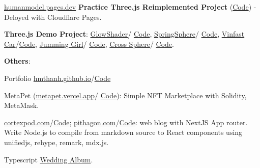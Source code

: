 \cvspace
\begin{twocolentry}{\href{https://humanmodel.pages.dev}{humanmodel.pages.dev}}
	\textbf{Practice Three.js Reimplemented Project} (\href{https://github.com/openhuman-ai/humanmodel}{Code}) - Deloyed with Cloudflare Pages.
\end{twocolentry}

\cvspace

\begin{onecolentry}
	\textbf{Three.js Demo Project}:
	\href{https://glowshader.vercel.app}{GlowShader}/ \href{https://github.com/hmthanh/GlowShader}{Code}, \href{https://springsphere.vercel.app}{SpringSphere}/
	\href{https://github.com/hmthanh/SpringSphere}{Code},
	\href{https://vinfast.vercel.app}{Vinfast Car}/\href{https://github.com/hmthanh/vinfastcar}{Code}, \href{https://jumming.vercel.app/}{Jumming Girl}/ \href{https://github.com/hmthanh/jumming-girl}{Code}, \href{https://crosssphere.vercel.app/}{Cross Sphere}/ \href{https://github.com/hmthanh/crosssphere}{Code}.
	
\end{onecolentry}

\cvspace

\begin{onecolentry}
	\textbf{Others}:
	
	\begin{highlights}
		\item Portfolio \href{https://hmthanh.github.io}{hmthanh.github.io}/\href{https://github.com/hmthanh/hmthanh.github.io}{Code}
		\item MetaPet (\href{https://metapet.vercel.app}{metapet.vercel.app}/ \href{https://github.com/hmthanh/metapet}{Code}): Simple NFT Marketplace with Solidity, MetaMask.
		
		\item \href{https://cortexpod.com}{cortexpod.com}/\href{https://github.com/cortexpod/cortexpod.github.io}{Code};  \href{https://pithagon.com}{pithagon.com}/\href{https://github.com/pithagon/pithagon.github.io}{Code}: web blog with NextJS App router. Write Node.js to compile from markdown source to React components using unifiedjs, rehype, remark, mdx.js.
		
		\item Typescript \href{https://wedding-album.vercel.app}{Wedding Album}.
	\end{highlights}
\end{onecolentry}

%        
%
%
%                
